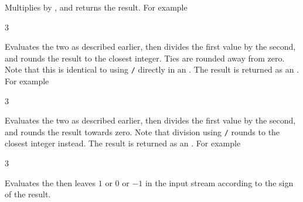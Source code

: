 \documentclass[oneside]{book}
\begin{document}
\begin{function}{\intMathMult}
\begin{syntax}
  
\end{syntax}
Multiplies  by ,
and returns the result. For example
\begin{demohigh}
 {3}
\end{demohigh}
\end{function}

\begin{function}{\intMathDiv}
\begin{syntax}
  
\end{syntax}
Evaluates the two  as described earlier,
then divides the first value by the second, and rounds the result
to the closest integer. Ties are rounded away from zero. Note that
this is identical to using \verb|/| directly in an .
The result is returned as an .
For example
\begin{demohigh}
 {3}
\end{demohigh}
\end{function}

\begin{function}{\intMathDivTrancate}
\begin{syntax}
  
\end{syntax}
Evaluates the two  as described earlier,
then divides the first value by the second, and rounds the result towards zero.
Note that division using \verb|/| rounds to the closest integer instead.
The result is returned as an .
For example
\begin{demohigh}
 {3}
\end{demohigh}
\end{function}

\begin{function}{\intMathSign}
\begin{syntax}
 
\end{syntax}
Evaluates the  then leaves $1$ or $0$ or
$-1$ in the input stream according to the sign of the result.
\end{function}
\end{document}
